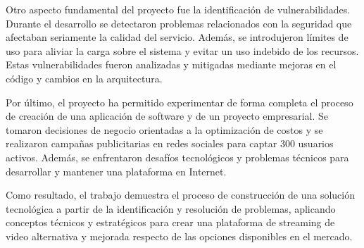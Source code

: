 Otro aspecto fundamental del proyecto fue la identificación de vulnerabilidades. Durante el desarrollo se detectaron problemas relacionados con la seguridad que afectaban seriamente la calidad del servicio. Además, se introdujeron límites de uso para aliviar la carga sobre el sistema y evitar un uso indebido de los recursos. Estas vulnerabilidades fueron analizadas y mitigadas mediante mejoras en el código y cambios en la arquitectura.

Por último, el proyecto ha permitido experimentar de forma completa el proceso de creación de una aplicación de software y de un proyecto empresarial. Se tomaron decisiones de negocio orientadas a la optimización de costos y se realizaron campañas publicitarias en redes sociales para captar 300 usuarios activos. Además, se enfrentaron desafíos tecnológicos y problemas técnicos para desarrollar y mantener una plataforma en Internet.

Como resultado, el trabajo demuestra el proceso de construcción de una solución tecnológica a partir de la identificación y resolución de problemas, aplicando conceptos técnicos y estratégicos para crear una plataforma de streaming de video alternativa y mejorada respecto de las opciones disponibles en el mercado.


